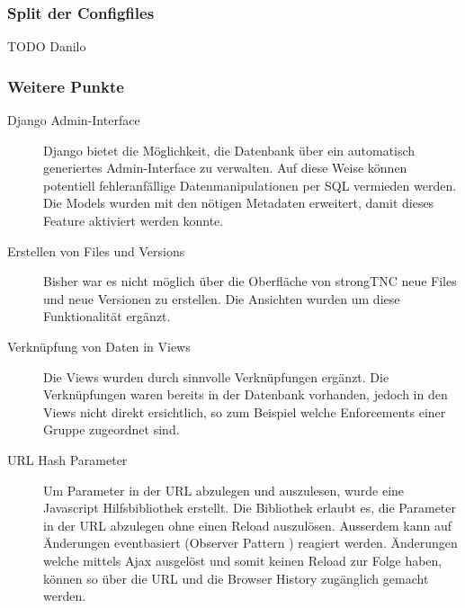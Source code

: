 \subsubsection{Split der Configfiles}
TODO Danilo

\subsubsection{Weitere Punkte}
\begin{description}
\item[Django Admin-Interface] Django bietet die Möglichkeit, die Datenbank über
ein automatisch generiertes Admin-Interface zu verwalten. Auf diese Weise
können potentiell fehleranfällige Datenmanipulationen per SQL vermieden
werden. Die Models wurden mit den nötigen Metadaten erweitert, damit dieses
Feature aktiviert werden konnte.

\item[Erstellen von Files und Versions] Bisher war es nicht möglich über die
Oberfläche von strongTNC neue Files und neue Versionen zu erstellen. Die
Ansichten wurden um diese Funktionalität ergänzt.

\item[Verknüpfung von Daten in Views] Die Views wurden durch sinnvolle
Verknüpfungen ergänzt. Die  Verknüpfungen waren bereits in der Datenbank
vorhanden, jedoch in den Views nicht direkt ersichtlich, so zum Beispiel welche
Enforcements einer Gruppe zugeordnet sind.

\item[URL Hash Parameter] Um Parameter in der URL abzulegen und auszulesen,
wurde eine Javascript Hilfsbibliothek erstellt. Die Bibliothek erlaubt es, die
Parameter in der URL abzulegen ohne einen Reload auszulösen. Ausserdem kann auf
Änderungen eventbasiert (Observer Pattern \cite{gamma1994design}) reagiert werden.
Änderungen welche mittels Ajax ausgelöst und somit keinen Reload zur Folge
haben, können so über die URL und die Browser History zugänglich gemacht werden.
\end{description}





